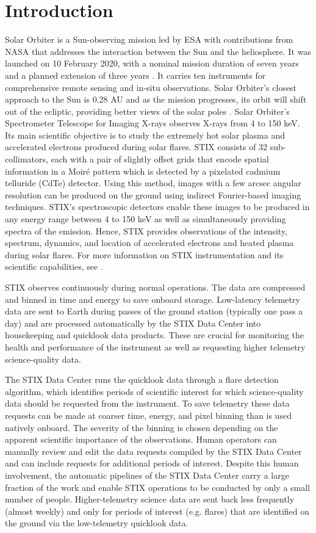\documentclass[referee]{preaa} %
\begin{document}
\section{Introduction}
Solar Orbiter is a Sun-observing mission led by ESA with contributions from NASA that 
addresses the interaction between the Sun and the heliosphere. It was launched on 10 February 2020, with a nominal mission duration of seven years and a planned extension of three years \citep{Mueller2020}.
It carries ten instruments for comprehensive
remote sensing and in-situ observations.
Solar Orbiter's closest approach to the Sun is 0.28 AU and as the mission progresses, its orbit will shift out of the ecliptic, providing better views of the solar poles \citep{SolarOrbiter2020}.
Solar Orbiter's Spectrometer Telescope for Imaging X-rays \citep[STIX;][]{stix2020} observes X-rays from 4 to 150 keV.  Its main scientific objective is to study the extremely hot solar plasma and accelerated electrons produced during solar flares.
STIX consists of 32 sub-collimators, each with a pair of slightly offset grids that encode spatial information in a Moiré pattern which is detected by a pixelated cadmium telluride (CdTe) detector. Using this method, images with a few arcsec angular resolution can be produced on the ground using indirect Fourier-based imaging techniques.  STIX's spectroscopic detectors enable these images to be produced in any energy range between 4 to 150 keV as well as simultaneously providing spectra of the emission. Hence, STIX provides observations of the intensity, spectrum, dynamics, and location of accelerated electrons and heated plasma during solar flares. For more information on STIX instrumentation and its scientific capabilities, see \citet{stix2020}.

STIX observes continuously during normal operations. The data are compressed and binned in time and energy to save onboard storage.  Low-latency telemetry data are sent to Earth during  passes of the ground station (typically one pass a day) and are processed automatically by the STIX Data Center into housekeeping and quicklook data products.  These are crucial for monitoring the health and performance of the instrument as well as requesting higher telemetry science-quality data.

The STIX Data Center runs the quicklook data through a flare detection algorithm, which identifies periods of scientific interest for which science-quality data should be requested from the instrument. To save telemetry these data requests can be made at coarser time, energy, and pixel binning than is used natively onboard.  The severity of the binning is chosen depending on the apparent scientific importance of the observations.  Human operators can manually review and edit the data requests compiled by the STIX Data Center and can include requests for additional periods of interest.  Despite this human involvement, the automatic pipelines of the STIX Data Center carry a large fraction of the work and enable STIX operations to be conducted by only a small number of people. 
Higher-telemetry science data  are sent back less frequently (almost weekly) and only for periods of interest (e.g. flares) that are identified on the ground via the low-telemetry quicklook data.  
\end{document}
